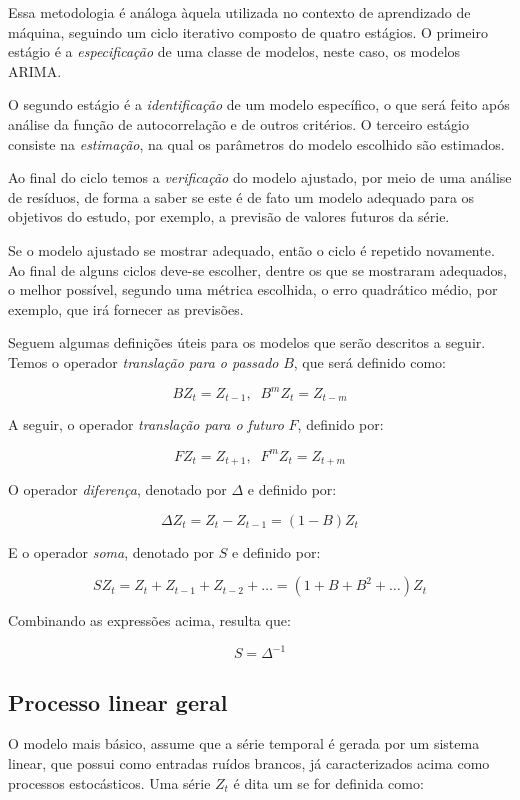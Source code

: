 Essa metodologia é análoga àquela utilizada no contexto de aprendizado de máquina, seguindo um ciclo iterativo composto de quatro estágios. O primeiro estágio é a \emph{especificação} de uma classe de modelos, neste caso, os modelos ARIMA.

O segundo estágio é a \emph{identificação} de um modelo específico, o  que será feito após análise da função de autocorrelação e de outros critérios. O terceiro estágio consiste na \emph{estimação}, na qual os parâmetros do modelo escolhido são estimados.

Ao final do ciclo temos a \emph{verificação} do modelo ajustado, por meio de uma análise de resíduos, de forma a saber se este é de fato um modelo adequado para os objetivos do estudo, por exemplo, a previsão de valores futuros da série.

Se o modelo ajustado se mostrar adequado, então o ciclo é repetido novamente. Ao final de alguns ciclos deve-se escolher, dentre os que se mostraram adequados, o melhor possível, segundo uma métrica escolhida, o erro quadrático médio, por exemplo, que irá fornecer as previsões.

Seguem algumas definições úteis para os modelos que serão descritos a seguir. Temos o operador \emph{translação para o passado} $B$, que será definido como:

\[ B Z_t = Z_{t-1} ,\;\; B^m Z_t = Z_{t-m} \]

A seguir, o operador \emph{translação para o futuro} $F$, definido por:

\[ F Z_t = Z_{t+1} ,\;\; F^m Z_t = Z_{t+m}  \]

O operador \emph{diferença}, denotado por $\Delta$ e definido por:

\begin{equation}\label{series:diferenca} 
\Delta Z_t = Z_t - Z_{t-1} = (1 - B)Z_t 
\end{equation}

E o operador \emph{soma}, denotado por $S$ e definido por:

\[ S Z_t = Z_t + Z_{t-1} + Z_{t-2} + \ldots = (1 + B + B^2 + \ldots)Z_t \]

Combinando as expressões acima, resulta que:

\[ S = \Delta^{-1} \]

\subsection{Processo linear geral}

O modelo mais básico, assume que a série temporal é gerada por um sistema linear, que possui como entradas ruídos brancos, já caracterizados acima como processos estocásticos. Uma série $Z_t$ é dita um  se for definida como:


